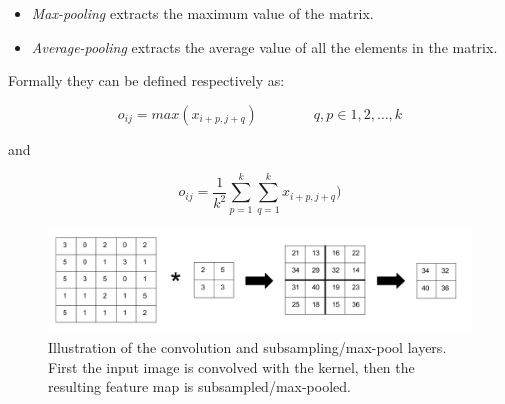 \begin{itemize}
	\item \textit{Max-pooling} extracts the maximum value of the matrix.
	\item \textit{Average-pooling} extracts the average value of all the elements in the matrix.
\end{itemize}

Formally they can be defined respectively as:

\begin{equation*}
o_{ij} = max(x_{i+p, j+q}) \qquad\qquad q,p \in 1, 2, \dots, k
\end{equation*}

and

\begin{equation*}
o_{ij} = \frac{1}{k^2} \sum_{p=1}^{k}\sum_{q=1}^{k} x_{i+p, j+q}) 
\end{equation*}

\begin{figure}[h!]
  \centering
      \includegraphics[width=1.0\textwidth]{Figures/Background/Convolution-Maxpooling}
  \caption{Illustration of the convolution and subsampling/max-pool layers. First the input image is convolved with the kernel, then the resulting feature map is subsampled/max-pooled.}
\end{figure}










